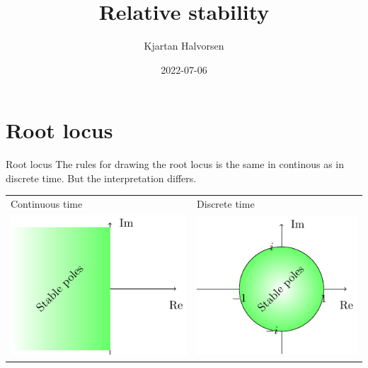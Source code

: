 \documentclass[presentation,aspectratio=169]{beamer}
\author{Kjartan Halvorsen}
\date{2022-07-06}
\title{Relative stability}
\begin{document}
\maketitle

\section{Root locus}
\label{sec:orgfe0ae11}
\begin{frame}[label={sec:org0dbae68}]{Root locus}
The rules for drawing the root locus is the same in continous as in discrete time. But the interpretation differs.
\begin{center}
\begin{tabular}{ll}
Continuous time & Discrete time\\
\includegraphics[width=0.28\linewidth]{../../figures/cont-stable} & \includegraphics[width=0.28\linewidth]{../../figures/discrete-stable}\\
\end{tabular}
\end{center}
\end{frame}
\end{document}
